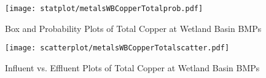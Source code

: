        \begin{figure}[hb]   %
            \centering
            \texttt{[image: statplot/metalsWBCopperTotalprob.pdf]}
            \caption{Box and Probability Plots of Total Copper at Wetland Basin BMPs}
        \end{figure}         %
        
        
        \begin{figure}[hb]   %
            \centering
            \texttt{[image: scatterplot/metalsWBCopperTotalscatter.pdf]}
            \caption{Influent vs. Effluent Plots of Total Copper at Wetland Basin BMPs}
        \end{figure}         %
        \clearpage
        
